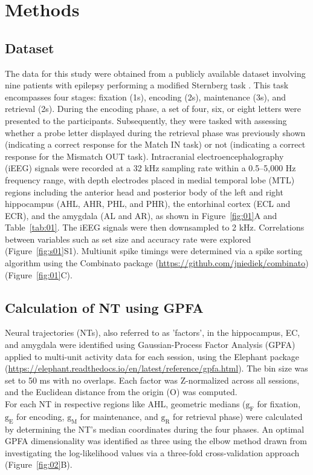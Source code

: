 \section{Methods}
\subsection{Dataset}
The data for this study were obtained from a publicly available dataset involving nine patients with epilepsy performing a modified Sternberg task \cite{boran_dataset_2020}. This task encompasses four stages: fixation (1s), encoding (2s), maintenance (3s), and retrieval (2s). During the encoding phase, a set of four, six, or eight letters were presented to the participants. Subsequently, they were tasked with assessing whether a probe letter displayed during the retrieval phase was previously shown (indicating a correct response for the Match IN task) or not (indicating a correct response for the Mismatch OUT task). Intracranial electroencephalography (iEEG) signals were recorded at a 32 kHz sampling rate within a 0.5--5,000 Hz frequency range, with depth electrodes placed in medial temporal lobe (MTL) regions including the anterior head and posterior body of the left and right hippocampus (AHL, AHR, PHL, and PHR), the entorhinal cortex (ECL and ECR), and the amygdala (AL and AR), as shown in Figure~\ref{fig:01}A and Table~\ref{tab:01}. The iEEG signals were then downsampled to 2 kHz. Correlations between variables such as set size and accuracy rate were explored (Figure~\ref{fig:s01}S1). Multiunit spike timings were determined via a spike sorting algorithm \cite{niediek_reliable_2016} using the Combinato package (\url{https://github.com/jniediek/combinato})(Figure~\ref{fig:01}C).

\subsection{Calculation of NT using GPFA}
Neural trajectories (NTs), also referred to as 'factors', in the hippocampus, EC, and amygdala were identified using Gaussian-Process Factor Analysis (GPFA) \cite{yu_gaussian-process_2009} applied to multi-unit activity data for each session, using the Elephant package (\url{https://elephant.readthedocs.io/en/latest/reference/gpfa.html}). The bin size was set to 50 ms with no overlaps. Each factor was Z-normalized across all sessions, and the Euclidean distance from the origin (O) was computed.
\\
\indent
For each NT in respective regions like AHL, geometric medians ($\mathrm{g_{F}}$ for fixation, $\mathrm{g_{E}}$ for encoding, $\mathrm{g_{M}}$ for maintenance, and $\mathrm{g_{R}}$ for retrieval phase) were calculated by determining the NT's median coordinates during the four phases. An optimal GPFA dimensionality was identified as three using the elbow method drawn from investigating the log-likelihood values via a three-fold cross-validation approach (Figure~\ref{fig:02}B).

